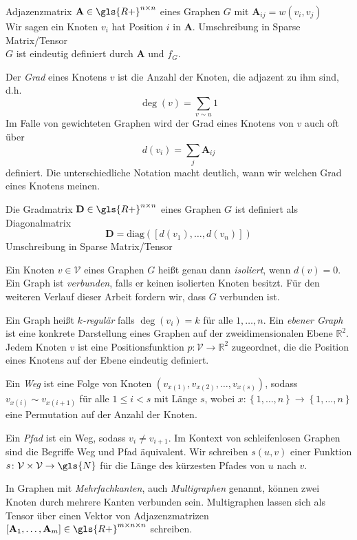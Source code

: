 Adjazenzmatrix $\mathbf{A} \in \gls{R+}^{n \times n}$ eines Graphen $G$ mit $\mathbf{A}_{ij} = w(v_i, v_j)$\\
Wir sagen ein Knoten $v_i$ hat Position $i$ in $\mathbf{A}$.
Umschreibung in Sparse Matrix/Tensor\\

$G$ ist eindeutig definiert durch $\mathbf{A}$ und $f_G$.

Der \emph{Grad} eines Knotens $v$ ist die Anzahl der Knoten, die adjazent zu ihm sind, d.h.
\begin{equation}
  \deg\left(v\right) = \sum_{v \sim u} 1
\end{equation}
Im Falle von gewichteten Graphen wird der Grad eines Knotens von $v$ auch oft über
\begin{equation}
  d\left(v_i\right) = \sum_{j} \mathbf{A}_{ij}
\end{equation}
definiert.
Die unterschiedliche Notation macht deutlich, wann wir welchen Grad eines Knotens meinen.

Die Gradmatrix $\mathbf{D} \in \gls{R+}^{n \times n}$ eines Graphen $G$ ist definiert als Diagonalmatrix
\begin{equation}
  \mathbf{D} = \text{diag}\left( \left[ d\left(v_1\right), \ldots, d\left(v_n\right) \right] \right)
\end{equation}
Umschreibung in Sparse Matrix/Tensor

Ein Knoten $v \in \mathcal{V}$ eines Graphen $G$ heißt genau dann \emph{isoliert}, wenn $d\left(v\right) = 0$.\\
Ein Graph ist \emph{verbunden}, falls er keinen isolierten Knoten besitzt.
Für den weiteren Verlauf dieser Arbeit fordern wir, dass $G$ verbunden ist.\

Ein Graph heißt \emph{$k$-regulär} falls $\deg\left(v_i\right) = k$ für alle $1, \ldots, n$.
Ein \emph{ebener Graph} ist eine konkrete Darstellung eines Graphen auf der zweidimensionalen Ebene $\mathbb{R}^2$.
Jedem Knoten $v$ ist eine Positionsfunktion $p \colon \mathcal{V} \to \mathbb{R}^2$ zugeordnet, die die Position eines Knotens auf der Ebene eindeutig definiert.

Ein \emph{Weg} ist eine Folge von Knoten $\left( v_{x\left(1\right)}, v_{x\left(2\right)}, \ldots, v_{x\left(s\right)} \right)$, sodass $v_{x\left(i\right)} \sim v_{x\left(i+1\right)}$ für alle $1 \leq i < s$ mit Länge $s$, wobei $x \colon \left\{ 1, \ldots, n \right\} \to \left\{ 1, \ldots, n \right\}$ eine Permutation auf der Anzahl der Knoten.

Ein \emph{Pfad} ist ein Weg, sodass $v_i \neq v_{i+1}$.
Im Kontext von schleifenlosen Graphen sind die Begriffe Weg und Pfad äquivalent.
Wir schreiben $s\left(u, v\right)$ einer Funktion $s \colon \mathcal{V} \times \mathcal{V} \to \gls{N}$ für die Länge des kürzesten Pfades von $u$ nach $v$.

In Graphen mit \emph{Mehrfachkanten}, auch \emph{Multigraphen} genannt, können zwei Knoten durch mehrere Kanten verbunden sein.
Multigraphen lassen sich als Tensor über einen Vektor von Adjazenzmatrizen $\left[\mathbf{A}_1, \ldots, \mathbf{A}_m\right] \in \gls{R+}^{m \times n \times n}$ schreiben.
